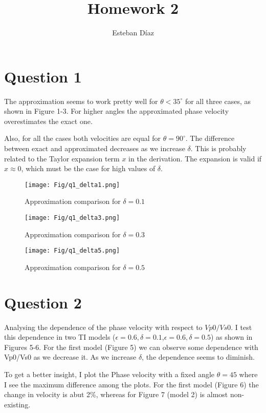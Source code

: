 \documentclass[10pt]{article}
\author{Esteban D\'{i}az}
\title{Homework 2}{}
\begin{document}
\maketitle

\section{Question 1}
The approximation seems to work pretty well for $\theta<35^\circ$ 
for all three cases, as shown in Figure 1-3. For higher angles 
the approximated phase velocity overestimates the  exact one.

Also, for all the cases both velocities are equal for $\theta=90^\circ$.
The difference between exact and approximated decreases as we increase
$\delta$. This is probably related to the Taylor expansion term
$x$ in the derivation. The expansion is valid if $x\approx0$, which 
must be the case for high values of $\delta$.


\begin{figure}
  \center
  \texttt{[image: Fig/q1\_delta1.png]}
  \caption{Approximation comparison for $\delta=0.1$}
\end{figure}

\begin{figure}
  \center
  \texttt{[image: Fig/q1\_delta3.png]}
  \caption{Approximation comparison for $\delta=0.3$}
\end{figure}

\begin{figure}
  \center
  \texttt{[image: Fig/q1\_delta5.png]}
  \caption{Approximation comparison for $\delta=0.5$}
\end{figure}


\section{Question 2}
Analysing the dependence of the phase velocity with respect
to $Vp0/Vs0$. I test this dependence in two TI models ($\epsilon=0.6,\delta=0.1$,$\epsilon=0.6,\delta=0.5$) as shown in Figures 5-6.
For the first model (Figure 5) we can observe some dependence with Vp0/Vs0
as we decrease it.  As we increase $\delta$, the dependence seems
to diminish. 

To get a better insight, I plot the Phase velocity with a fixed angle $\theta=45$
where I see the maximum difference among the plots. For the first model (Figure 6)
the change in velocity is abut 2\%, whereas for Figure 7 (model 2) is almost non-existing.
\end{document}
